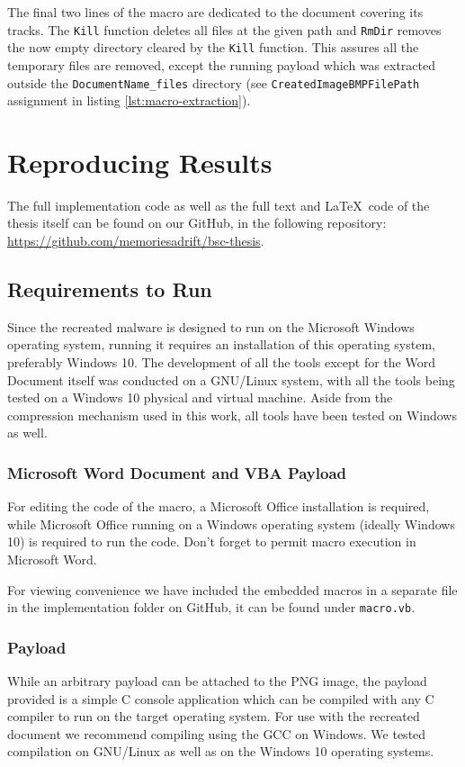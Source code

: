 The final two lines of the macro are dedicated to the document covering its tracks. The \verb+Kill+ function deletes all
files at the given path and \verb+RmDir+ removes the now empty directory cleared by the \verb+Kill+ function. This
assures all the temporary files are removed, except the running payload which was extracted outside the \verb+DocumentName_files+
directory (see \verb+CreatedImageBMPFilePath+ assignment in listing \ref{lst:macro-extraction}).

\section{Reproducing Results}\label{sec:reproducing-results}
The full implementation code as well as the full text and \LaTeX\ code of the thesis itself can be found 
on our GitHub, in the following repository: \url{https://github.com/memoriesadrift/bsc-thesis}.

\subsection{Requirements to Run}
Since the recreated malware is designed to run on the Microsoft Windows operating system, running it requires
an installation of this operating system, preferably Windows 10. %
The development of all the tools except for the Word Document itself was conducted on a GNU/Linux system, with all
the tools being tested on a Windows 10 physical and virtual machine. Aside from the compression mechanism used in this
work, all tools have been tested on Windows as well.

\subsubsection{Microsoft Word Document and VBA Payload}
For editing the code of the macro, a Microsoft Office installation is required, while Microsoft Office running 
on a Windows operating system (ideally Windows 10) is required to run the code. Don't forget to permit macro 
execution in Microsoft Word. 

For viewing convenience we have included the embedded macros in a separate file in the implementation folder on
GitHub, it can be found under \verb+macro.vb+.

\subsubsection{Payload}
While an arbitrary payload can be attached to the \acrshort{PNG} image, the payload provided is a simple C console
application which can be compiled with any C compiler to run on the target operating system. For use with the 
recreated document we recommend compiling using the \acrfull{GCC} on Windows. We tested compilation on GNU/Linux
as well as on the Windows 10 operating systems.

